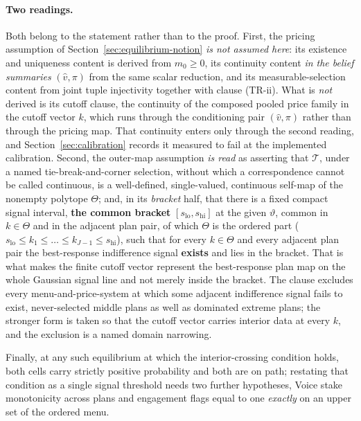 \documentclass[11pt]{article}
\newcommand{\Tmap}{\mathcal{T}}
\begin{document}
\paragraph{Two readings.} Both belong to the statement rather than to the proof. First, the pricing
assumption of Section~\ref{sec:equilibrium-notion} \emph{is not assumed here}: its existence and
uniqueness content is derived from $m_0\geq0$, its continuity content \emph{in the belief summaries}
$(\hat v,\pi)$ from the same scalar reduction, and its measurable-selection content from joint tuple
injectivity together with clause (TR-ii). What is \emph{not} derived is its cutoff clause, the
continuity of the composed pooled price family in the cutoff vector $k$, which runs through the
conditioning pair $(\hat v,\pi)$ rather than through the pricing map. That continuity enters only
through the second reading, and Section~\ref{sec:calibration} records it measured to fail at the
implemented calibration. Second, the outer-map assumption \emph{is read} as asserting that $\Tmap$,
under a named tie-break-and-corner selection, without which a correspondence cannot be called
continuous, is a well-defined, single-valued, continuous self-map of the nonempty polytope
$\Theta$; and, in its \emph{bracket} half, that there is a fixed compact signal interval, \textbf{the
common bracket} $[s_{\mathrm{lo}},s_{\mathrm{hi}}]$ at the given $\vartheta$, common in
$k\in\Theta$ and in the adjacent plan pair, of which $\Theta$ is the ordered part
($s_{\mathrm{lo}}\leq k_1\leq\dots\leq k_{J-1}\leq s_{\mathrm{hi}}$), such that for every
$k\in\Theta$ and every adjacent plan pair the best-response indifference signal \textbf{exists} and
lies in the bracket. That is what makes the finite cutoff vector represent the best-response plan
map on the whole Gaussian signal line and not merely inside the bracket. The clause excludes every
menu-and-price-system at which some adjacent indifference signal fails to exist, never-selected
middle plans as well as dominated extreme plans; the stronger form is taken so that the cutoff
vector carries interior data at every $k$, and the exclusion is a named domain narrowing.

Finally, at any such equilibrium at which the interior-crossing condition holds, both cells carry
strictly positive probability and both are on path; restating that condition as a single signal
threshold needs two further hypotheses, Voice stake monotonicity across plans and engagement flags
equal to one \emph{exactly} on an upper set of the ordered menu.
\end{document}
